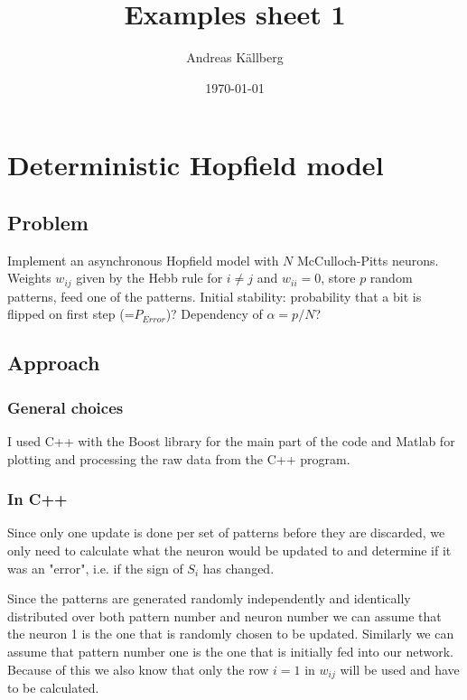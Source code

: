 \documentclass[12pt,a4paper]{article}
\begin{document}
\title{Examples sheet 1}
\author{Andreas Källberg}
\date{\today}
\maketitle

\begin{abstract}

\end{abstract}

\newpage
\tableofcontents
\newpage


\section{\label{dhm}Deterministic Hopfield model}
\subsection{Problem}
Implement an asynchronous Hopfield model with $N$ McCulloch-Pitts neurons. Weights $w_{i j}$
given by the Hebb rule for $i \neq j$ and $w_{ii}=0$, store $p$ random
patterns, feed one of the patterns. Initial stability: probability that a bit
is flipped on first step (=$P_{Error}$)? Dependency of $\alpha = p/N$?


\subsection{Approach} \label{app1}
\subsubsection{General choices}
I used C++ with the Boost library for the main part of the code and Matlab for plotting and processing the raw data from the C++ program.

\subsubsection{In C++}
Since only one update is done per set of patterns before they are discarded, we
only need to calculate what the neuron would be updated to and determine if it was an "error", i.e. if the sign of $S_i$ has changed.

Since the patterns are generated randomly independently and identically
distributed over both pattern number and neuron number we can assume that the
neuron 1 is the one that is randomly chosen to be updated. Similarly we can
assume that pattern number one is the one that is initially fed into our
network.  Because of this we also know that only the row $i=1$ in $w_{ij}$
will be used and have to be calculated.
\end{document}
